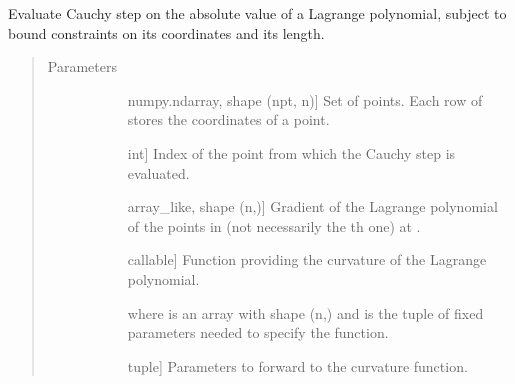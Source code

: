 \documentclass[letterpaper,10pt,english]{sphinxmanual}
\begin{document}
\begin{fulllineitems}
\label{\detokenize{refs/generated/cobyqa.linalg.bvcs:cobyqa.linalg.bvcs}}
\sphinxAtStartPar
Evaluate Cauchy step on the absolute value of a Lagrange polynomial, subject
to bound constraints on its coordinates and its length.
\begin{quote}\begin{description}
\item[{Parameters}] \leavevmode\begin{description}
\item[{}] \leavevmode{[}numpy.ndarray, shape (npt, n){]}
\sphinxAtStartPar
Set of points. Each row of  stores the coordinates of a point.

\item[{}] \leavevmode{[}int{]}
\sphinxAtStartPar
Index of the point from which the Cauchy step is evaluated.

\item[{}] \leavevmode{[}array\_like, shape (n,){]}
\sphinxAtStartPar
Gradient of the Lagrange polynomial of the points in  (not
necessarily the \sphinxhyphen{}th one) at .

\item[{}] \leavevmode{[}callable{]}
\sphinxAtStartPar
Function providing the curvature of the Lagrange polynomial.
\begin{quote}

\sphinxAtStartPar
{}
\end{quote}

\sphinxAtStartPar
where  is an array with shape (n,) and  is the tuple of
fixed parameters needed to specify the function.

\item[{}] \leavevmode{[}tuple{]}
\sphinxAtStartPar
Parameters to forward to the curvature function.


\end{description}
\end{description}
\end{quote}
\end{fulllineitems}
\end{document}

